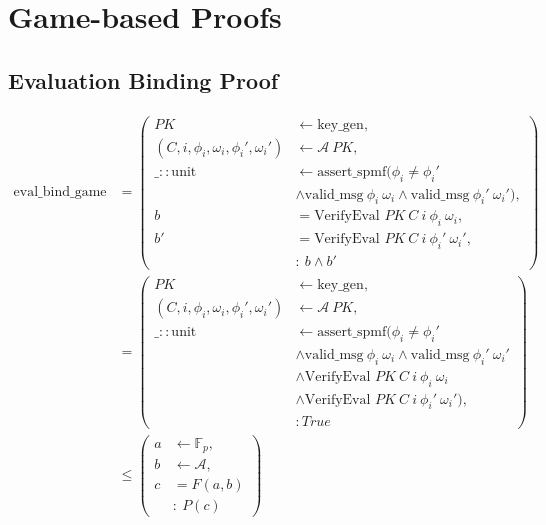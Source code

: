 \chapter{Game-based Proofs}\label{appendix:security}

\section{Evaluation Binding Proof}
\begin{equation*}
    \begin{aligned}
        \text{eval\_bind\_game}&=\left(
        \begin{aligned}
            PK & \leftarrow \text{key\_gen}, \\
            (C, i,\phi_i,\omega_i, \phi_i',\omega_i') & \leftarrow \mathcal{A} \ PK, \\
            \_::\text{unit} & \leftarrow \text{assert\_spmf}(\phi_i \ne \phi_i' \\
            &\land \text{valid\_msg}\ \phi_i\ \omega_i \land \text{valid\_msg}\ \phi_i'\ \omega_i'), \\
            b &= \text{VerifyEval } PK\ C\ i\ \phi_i\ \omega_i,\\
            b' &= \text{VerifyEval } PK\ C\ i\ \phi_i'\ \omega_i',\\
            & : \ b \land b'
        \end{aligned}
        \right)\\
        &= \left(
            \begin{aligned}
                PK & \leftarrow \text{key\_gen}, \\
                (C, i,\phi_i,\omega_i, \phi_i',\omega_i') & \leftarrow \mathcal{A} \ PK, \\
                \_::\text{unit} & \leftarrow \text{assert\_spmf}(\phi_i \ne \phi_i' \\
                &\land \text{valid\_msg}\ \phi_i\ \omega_i \land \text{valid\_msg}\ \phi_i'\ \omega_i' \\
                &\land \text{VerifyEval } PK\ C\ i\ \phi_i\ \omega_i\\
                &\land \text{VerifyEval } PK\ C\ i\ \phi_i'\ \omega_i'),\\
                & : True
            \end{aligned}
            \right)\\
        &\le \left(
            \begin{aligned}
                a & \leftarrow \mathbb{F}_p, \\
                b & \leftarrow \mathcal{A}, \\
                c & = F(a,b) \\
                & : \ P(c)
            \end{aligned}
            \right)
    \end{aligned}
\end{equation*}

